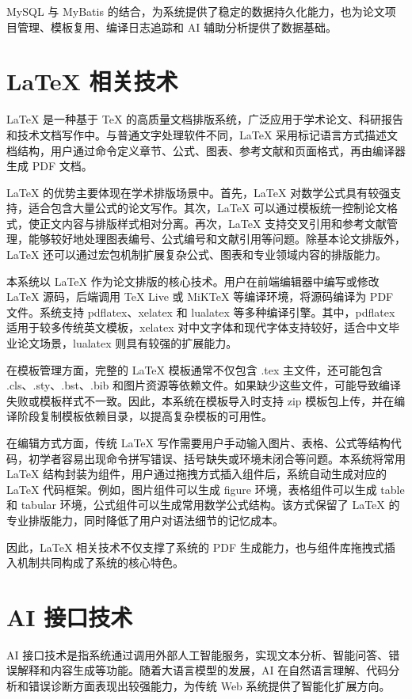 \documentclass{xduugthesis}
\begin{document}
MySQL 与 MyBatis 的结合，为系统提供了稳定的数据持久化能力，也为论文项目管理、模板复用、编译日志追踪和 AI 辅助分析提供了数据基础。

\section{LaTeX 相关技术}
LaTeX 是一种基于 TeX 的高质量文档排版系统，广泛应用于学术论文、科研报告和技术文档写作中。与普通文字处理软件不同，LaTeX 采用标记语言方式描述文档结构，用户通过命令定义章节、公式、图表、参考文献和页面格式，再由编译器生成 PDF 文档\cite{knuth1984texbook}。

LaTeX 的优势主要体现在学术排版场景中。首先，LaTeX 对数学公式具有较强支持，适合包含大量公式的论文写作\cite{ye2018latex}。其次，LaTeX 可以通过模板统一控制论文格式，使正文内容与排版样式相对分离。再次，LaTeX 支持交叉引用和参考文献管理，能够较好地处理图表编号、公式编号和文献引用等问题。除基本论文排版外，LaTeX 还可以通过宏包机制扩展复杂公式、图表和专业领域内容的排版能力\cite{strokov1998macropackage}。

本系统以 LaTeX 作为论文排版的核心技术。用户在前端编辑器中编写或修改 LaTeX 源码，后端调用 TeX Live 或 MiKTeX 等编译环境，将源码编译为 PDF 文件。系统支持 pdflatex、xelatex 和 lualatex 等多种编译引擎。其中，pdflatex 适用于较多传统英文模板，xelatex 对中文字体和现代字体支持较好，适合中文毕业论文场景，lualatex 则具有较强的扩展能力。

在模板管理方面，完整的 LaTeX 模板通常不仅包含 .tex 主文件，还可能包含 .cls、.sty、.bst、.bib 和图片资源等依赖文件。如果缺少这些文件，可能导致编译失败或模板样式不一致。因此，本系统在模板导入时支持 zip 模板包上传，并在编译阶段复制模板依赖目录，以提高复杂模板的可用性。

在编辑方式方面，传统 LaTeX 写作需要用户手动输入图片、表格、公式等结构代码，初学者容易出现命令拼写错误、括号缺失或环境未闭合等问题。本系统将常用 LaTeX 结构封装为组件，用户通过拖拽方式插入组件后，系统自动生成对应的 LaTeX 代码框架。例如，图片组件可以生成 figure 环境，表格组件可以生成 table 和 tabular 环境，公式组件可以生成常用数学公式结构。该方式保留了 LaTeX 的专业排版能力，同时降低了用户对语法细节的记忆成本。

因此，LaTeX 相关技术不仅支撑了系统的 PDF 生成能力，也与组件库拖拽式插入机制共同构成了系统的核心特色。

\section{AI 接口技术}
AI 接口技术是指系统通过调用外部人工智能服务，实现文本分析、智能问答、错误解释和内容生成等功能。随着大语言模型的发展，AI 在自然语言理解、代码分析和错误诊断方面表现出较强能力，为传统 Web 系统提供了智能化扩展方向\cite{vaswani2017attention}。
\end{document}
